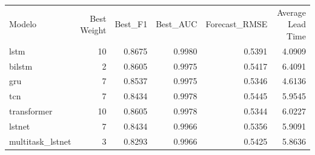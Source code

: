 \begin{tabular}{lrrrrr}
Modelo & Best Weight & Best_F1 & Best_AUC & Forecast_RMSE & Average Lead Time \\
lstm & 10 & 0.8675 & 0.9980 & 0.5391 & 4.0909 \\
bilstm & 2 & 0.8605 & 0.9975 & 0.5417 & 6.4091 \\
gru & 7 & 0.8537 & 0.9975 & 0.5346 & 4.6136 \\
tcn & 7 & 0.8434 & 0.9978 & 0.5445 & 5.9545 \\
transformer & 10 & 0.8605 & 0.9978 & 0.5344 & 6.0227 \\
lstnet & 7 & 0.8434 & 0.9966 & 0.5356 & 5.9091 \\
multitask_lstnet & 3 & 0.8293 & 0.9966 & 0.5425 & 5.8636 \\
\end{tabular}
